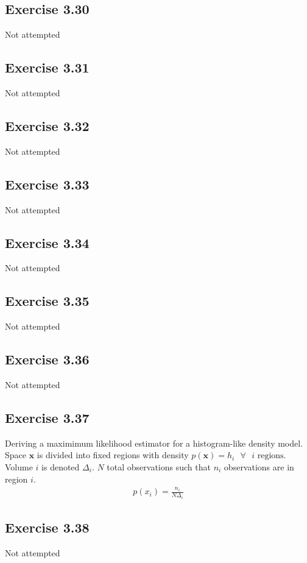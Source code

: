 \subsection{Exercise 3.30}
Not attempted

\subsection{Exercise 3.31}
Not attempted

\subsection{Exercise 3.32}
Not attempted

\subsection{Exercise 3.33}
Not attempted

\subsection{Exercise 3.34}
Not attempted

\subsection{Exercise 3.35}
Not attempted

\subsection{Exercise 3.36}
Not attempted

\subsection{Exercise 3.37}
Deriving a maximimum likelihood estimator for a histogram-like density model. Space $\mathbf{x}$ is divided into fixed regions with density $p(\mathbf{x}) = h_i \text{ }\forall\text{ } i \text{ regions}$. Volume $i$ is denoted $\Delta_i$. $N$ total observations such that $n_i$ observations are in region $i$.
\begin{gather}
  p(x_i) = \frac{n_i}{N\Delta_i}
\end{gather}

\subsection{Exercise 3.38}
Not attempted